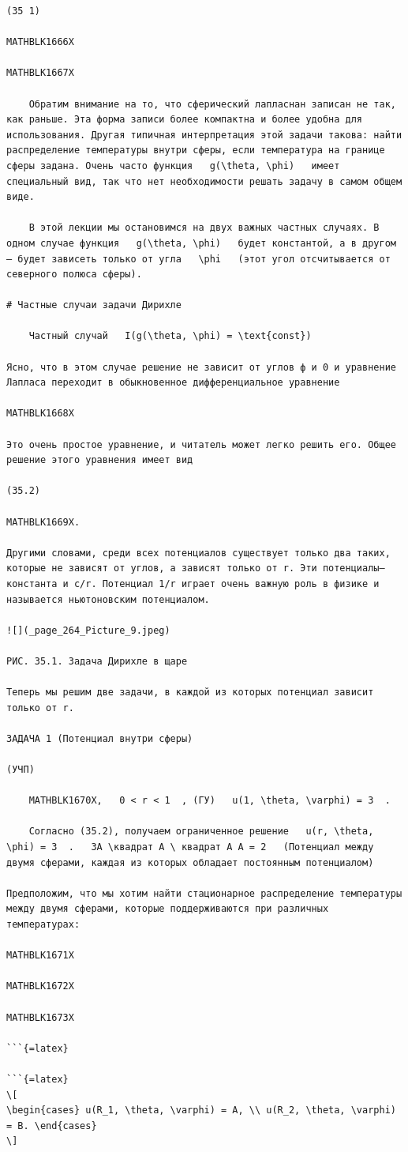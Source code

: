 \documentclass[
]{article}
\begin{document}
\begin{verbatim}
(35 1)

MATHBLK1666X

MATHBLK1667X

    Обратим внимание на то, что сферический лапласнан записан не так, как раньше. Эта форма записи более компактна и более удобна для использования. Другая типичная интерпретация этой задачи такова: найти распределение температуры внутри сферы, если температура на границе сферы задана. Очень часто функция   g(\theta, \phi)   имеет специальный вид, так что нет необходимости решать задачу в самом общем виде.

    В этой лекции мы остановимся на двух важных частных случаях. В одном случае функция   g(\theta, \phi)   будет константой, а в другом — будет зависеть только от угла   \phi   (этот угол отсчитывается от северного полюса сферы).

# Частные случаи задачи Дирихле

    Частный случай   I(g(\theta, \phi) = \text{const}) 

Ясно, что в этом случае решение не зависит от углов ф и 0 и уравнение Лапласа переходит в обыкновенное дифференциальное уравнение

MATHBLK1668X

Это очень простое уравнение, и читатель может легко решить его. Общее решение этого уравнения имеет вид

(35.2)

MATHBLK1669X.

Другими словами, среди всех потенциалов существует только два таких, которые не зависят от углов, а зависят только от r. Эти потенциалы— константа и c/r. Потенциал 1/r играет очень важную роль в физике и называется ньютоновским потенциалом.

![](_page_264_Picture_9.jpeg)

РИС. 35.1. Задача Дирихле в щаре

Теперь мы решим две задачи, в каждой из которых потенциал зависит только от r.

ЗАДАЧА 1 (Потенциал внутри сферы)

(УЧП)

    MATHBLK1670X,   0 < r < 1  , (ГУ)   u(1, \theta, \varphi) = 3  .

    Согласно (35.2), получаем ограниченное решение   u(r, \theta, \phi) = 3  .   3A \квадрат A \ квадрат A A = 2   (Потенциал между двумя сферами, каждая из которых обладает постоянным потенциалом)

Предположим, что мы хотим найти стационарное распределение температуры между двумя сферами, которые поддерживаются при различных температурах:

MATHBLK1671X

MATHBLK1672X

MATHBLK1673X

```{=latex}

```{=latex}
\[
\begin{cases} u(R_1, \theta, \varphi) = A, \\ u(R_2, \theta, \varphi) = B. \end{cases}
\]
\end{verbatim}
\end{document}
